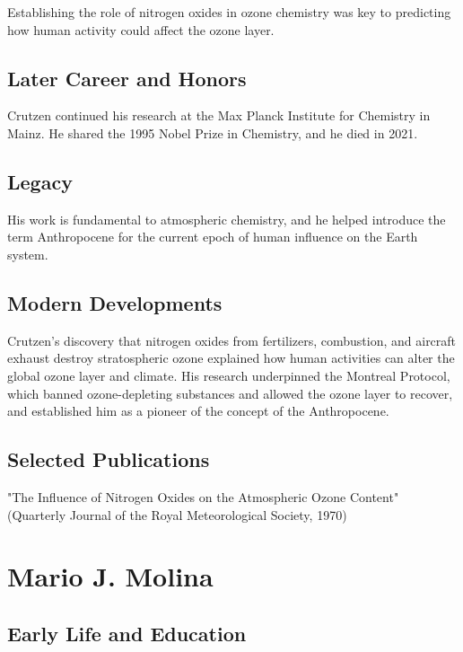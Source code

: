 Establishing the role of nitrogen oxides in ozone chemistry was key to predicting how human activity could affect the ozone layer.

\subsection*{Later Career and Honors}

Crutzen continued his research at the Max Planck Institute for Chemistry in Mainz. He shared the 1995 Nobel Prize in Chemistry, and he died in 2021.

\subsection*{Legacy}

His work is fundamental to atmospheric chemistry, and he helped introduce the term Anthropocene for the current epoch of human influence on the Earth system.

\subsection*{Modern Developments}

Crutzen's discovery that nitrogen oxides from fertilizers, combustion, and aircraft exhaust destroy stratospheric ozone explained how human activities can alter the global ozone layer and climate. His research underpinned the Montreal Protocol, which banned ozone-depleting substances and allowed the ozone layer to recover, and established him as a pioneer of the concept of the Anthropocene.

\subsection*{Selected Publications}

"The Influence of Nitrogen Oxides on the Atmospheric Ozone Content" (Quarterly Journal of the Royal Meteorological Society, 1970)

\clearpage

\section{Mario J. Molina}

\subsection*{Early Life and Education}

